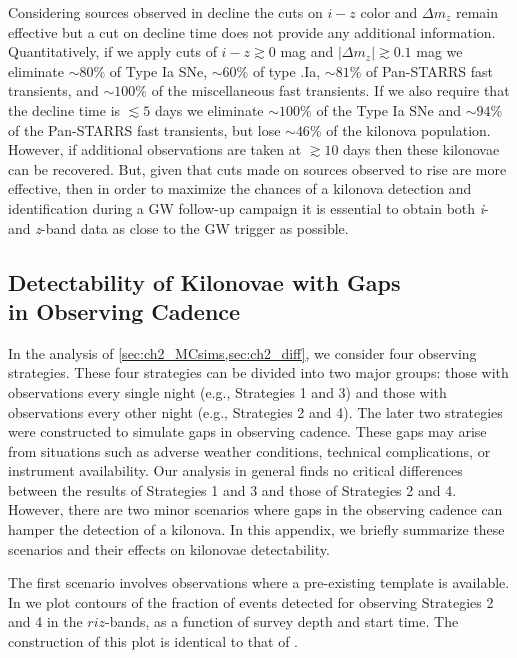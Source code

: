 Considering sources observed in decline the cuts on $i-z$ color and $\Delta m_z$ remain effective but a cut on decline time does not provide any additional information. Quantitatively, if we apply cuts of $i-z \gtrsim 0$ mag and $|\Delta m_z| \gtrsim 0.1$ mag we eliminate $\sim80\%$ of Type Ia SNe, $\sim60\%$ of type .Ia, $\sim81\%$ of Pan-STARRS fast transients, and $\sim 100\%$ of the miscellaneous fast transients. If we also require that the decline time is $\lesssim 5$ days we eliminate $\sim 100\%$ of the Type Ia SNe and $\sim94\%$ of the Pan-STARRS fast transients, but lose $\sim46\%$ of the kilonova population. However, if additional observations are taken at $\gtrsim10$ days then these kilonovae can be recovered. But, given that cuts made on sources observed to rise are more effective, then in order to maximize the chances of a kilonova detection and identification during a GW follow-up campaign it is essential to obtain both {\em i}- and {\em z}-band data as close to the GW trigger as possible. 

\subsection{Detectability of Kilonovae with Gaps\\ in Observing Cadence}
\label{sec:ch2_MCdet_gaps}
In the analysis of \cref{sec:ch2_MCsims,sec:ch2_diff}, we consider four observing strategies. These four strategies can be divided into two major groups: those with observations every single night (e.g., Strategies 1 and 3) and those with observations every other night (e.g., Strategies 2 and 4). The later two strategies were constructed to simulate gaps in observing cadence. These gaps may arise from situations such as adverse weather conditions, technical complications, or instrument availability. Our analysis in general finds no critical differences between the results of Strategies 1 and 3 and those of Strategies 2 and 4. However, there are two minor scenarios where gaps in the observing cadence can hamper the detection of a kilonova. In this appendix, we briefly summarize these scenarios and their effects on kilonovae detectability. 

The first scenario involves observations where a pre-existing template is available. In  we plot contours of the fraction of events detected for observing Strategies 2 and 4 in the $riz$-bands, as a function of survey depth and start time. The construction of this plot is identical to that of .

